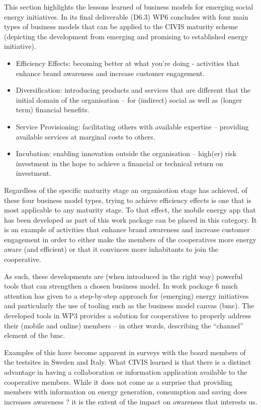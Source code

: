 This section highlights the lessons learned of business models for emerging social energy initiatives.
In its final deliverable (D6.3) WP6 concludes with four main types of business models that can be applied to the CIVIS maturity scheme (depicting the development from emerging and promising to established energy initiative). 

\begin{itemize}
\item Efficiency Effects: becoming better at what you're doing - activities that enhance brand awareness and increase customer engagement.
\item Diversification: introducing products and services that are different that the initial domain of the organisation -- for (indirect) social as well as (longer term) financial benefits. 
\item Service Provisioning: facilitating others with available expertise -- providing available services at marginal costs to others.
\item Incubation: enabling innovation outside the organisation -- high(er) risk investment in the hope to achieve a financial or technical return on investment. 
\end{itemize}

Regardless of the specific maturity stage an organisation stage has achieved, of these four business model types, trying to achieve efficiency effects is one that is most applicable to any maturity stage. 
% 
To that effect, the mobile energy app that has been developed as part of this work package can be placed in this category. It is an example of activities that enhance brand awareness and increase customer engagement in order to either make the members of the cooperatives more energy aware (and efficient) or that it convinces more inhabitants to join the cooperative.

As such, these developments are (when introduced in the right way) powerful tools that can strengthen a chosen business model. In work package 6 much attention has given to a step-by-step approach for (emerging) energy initiatives and particularly the use of tooling such as the business model canvas (bmc). The developed tools in WP3 provides a solution for cooperatives to properly address their (mobile and online) members -- in other words, describing the ``channel'' element of the bmc.

Examples of this have become apparent in surveys with the board members of the testsites
in Sweden and Italy. What CIVIS learned is that there is a distinct advantage in having
a collaboration or information application available to the cooperative members.
While it does not come as a surprise that providing members with information on energy
generation, consumption and saving does increases awareness ? it is the extent of the impact
on awareness that interests us.

